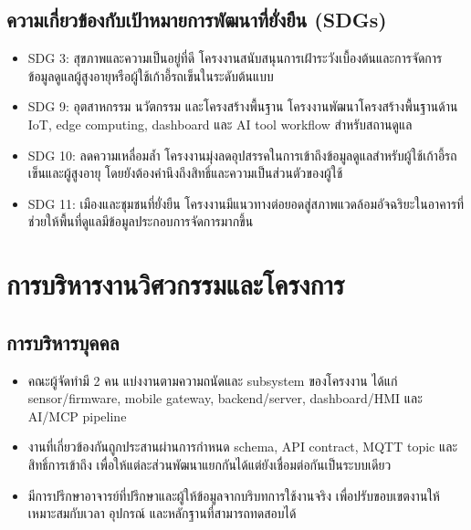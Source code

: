 \subsection*{ความเกี่ยวข้องกับเป้าหมายการพัฒนาที่ยั่งยืน (SDGs)}
\begin{itemize}
    \item SDG 3: สุขภาพและความเป็นอยู่ที่ดี โครงงานสนับสนุนการเฝ้าระวังเบื้องต้นและการจัดการข้อมูลดูแลผู้สูงอายุหรือผู้ใช้เก้าอี้รถเข็นในระดับต้นแบบ 
    \item SDG 9: อุตสาหกรรม นวัตกรรม และโครงสร้างพื้นฐาน โครงงานพัฒนาโครงสร้างพื้นฐานด้าน IoT, edge computing, dashboard และ AI tool workflow สำหรับสถานดูแล 
    \item SDG 10: ลดความเหลื่อมล้ำ โครงงานมุ่งลดอุปสรรคในการเข้าถึงข้อมูลดูแลสำหรับผู้ใช้เก้าอี้รถเข็นและผู้สูงอายุ โดยยังต้องคำนึงถึงสิทธิ์และความเป็นส่วนตัวของผู้ใช้ 
    \item SDG 11: เมืองและชุมชนที่ยั่งยืน โครงงานมีแนวทางต่อยอดสู่สภาพแวดล้อมอัจฉริยะในอาคารที่ช่วยให้พื้นที่ดูแลมีข้อมูลประกอบการจัดการมากขึ้น 
\end{itemize}

\section{การบริหารงานวิศวกรรมและโครงการ}

\subsection*{การบริหารบุคคล}
\begin{itemize}
    \item คณะผู้จัดทำมี 2 คน แบ่งงานตามความถนัดและ subsystem ของโครงงาน ได้แก่ sensor/firmware, mobile gateway, backend/server, dashboard/HMI และ AI/MCP pipeline 
    \item งานที่เกี่ยวข้องกันถูกประสานผ่านการกำหนด schema, API contract, MQTT topic และสิทธิ์การเข้าถึง เพื่อให้แต่ละส่วนพัฒนาแยกกันได้แต่ยังเชื่อมต่อกันเป็นระบบเดียว 
    \item มีการปรึกษาอาจารย์ที่ปรึกษาและผู้ให้ข้อมูลจากบริบทการใช้งานจริง เพื่อปรับขอบเขตงานให้เหมาะสมกับเวลา อุปกรณ์ และหลักฐานที่สามารถทดสอบได้ 
\end{itemize}

